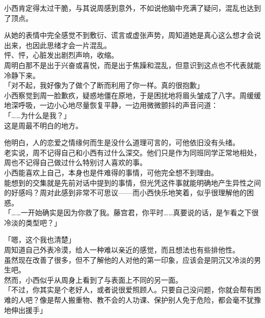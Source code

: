 小西肯定得太过干脆，与其说周感到意外，不如说他脑中充满了疑问，混乱也达到了顶点。

从她的表情中完全感觉不到敷衍、谎言或虚张声势，周知道她是真心这么想才会说出来，也因此思绪才会一片混乱。\\

怦、怦，心脏发出剧烈声响，收缩。\\

周明白那不是出于兴奋或喜悦，而是出于焦躁和混乱，但意识到这点也不代表就能冷静下来。\\

「对不起，我好像为了做个了断而利用了你一样。真的很抱歉」\\

小西察觉到周一脸歉疚，疑惑地僵在原地，于是困扰地将眉头皱成了八字。周缓缓地深呼吸，一边小心地尽量恢复平静，一边用微微颤抖的声音问道：\\

「……为什么是我？」\\

这是周最不明白的地方。

他明白，人的恋爱之情缘何而生是没什么道理可言的，可他依旧没有头绪。\\

老实说，周不记得自己和小西有过什么深交。他们只是作为同班同学正常地相处，周也不记得自己做过什么特别讨人喜欢的事。\\

小西能喜欢上自己，本身也是件难得的事情，可他完全想不到理由。\\

能想到的交集就是先前对话中提到的事情，但光凭这件事就能明确地产生异性之间的好感吗？周对此感到非常不可思议——而小西快乐地笑着，似乎很理解他的困惑。\\

「……一开始确实是因为你救了我。藤宫君，你平时……真要说的话，是乍看之下很冷淡的类型吧？」

「嗯，这个我也清楚」\\

周知道自己外表冷漠，给人一种难以亲近的感觉，而且想法也有些排他性。\\

虽然现在改善了很多，但不了解他的人对他的第一印象，应该会是阴沉又冷淡的男生吧。\\

然而，小西似乎从周身上看到了与表面上不同的另一面。\\

「不过，你其实是个老好人，或者说很爱照顾人。只要自己没问题，你就会帮有困难的人吧？像是帮人搬重物、教不会的人功课、保护别人免于危险，都会毫不犹豫地伸出援手」

